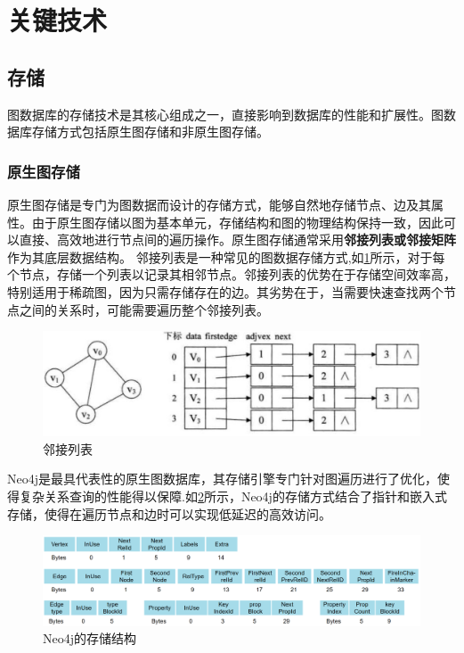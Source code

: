 \section{关键技术}

\subsection{存储}

图数据库的存储技术是其核心组成之一，直接影响到数据库的性能和扩展性。图数据库存储方式包括原生图存储和非原生图存储。
\vspace{1cm}
\subsubsection{原生图存储}

原生图存储是专门为图数据而设计的存储方式，能够自然地存储节点、边及其属性。由于原生图存储以图为基本单元，存储结构和图的物理结构保持一致，因此可以直接、高效地进行节点间的遍历操作。原生图存储通常采用\textbf{邻接列表或邻接矩阵}作为其底层数据结构。
邻接列表是一种常见的图数据存储方式,如\cref{fig:adjacency-list}所示，对于每个节点，存储一个列表以记录其相邻节点。邻接列表的优势在于存储空间效率高，特别适用于稀疏图，因为只需存储存在的边。其劣势在于，当需要快速查找两个节点之间的关系时，可能需要遍历整个邻接列表。\begin{figure}[H]
	\centering
	\includegraphics[width=1\textwidth]{images/11.png}
	\caption{邻接列表}
	\label{fig:adjacency-list}
\end{figure}

Neo4j是最具代表性的原生图数据库，其存储引擎专门针对图遍历进行了优化，使得复杂关系查询的性能得以保障.如\cref{fig:neo4j}所示，Neo4j的存储方式结合了指针和嵌入式存储，使得在遍历节点和边时可以实现低延迟的高效访问。\begin{figure}[H]
	\centering
	\includegraphics[width=1\textwidth]{images/4.png}
	\caption{Neo4j的存储结构}
	\label{fig:neo4j}
\end{figure}

